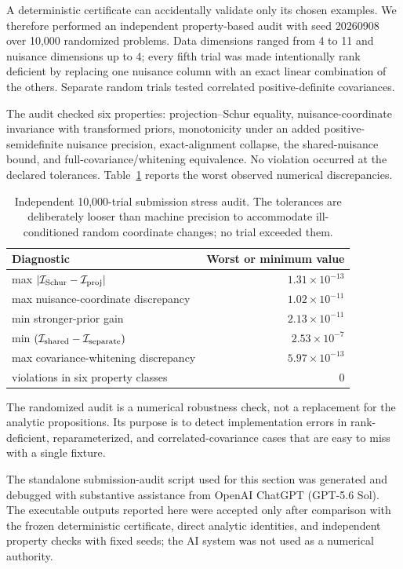A deterministic certificate can accidentally validate only its chosen examples. We therefore performed an independent property-based audit with seed 20260908 over 10,000 randomized problems. Data dimensions ranged from 4 to 11 and nuisance dimensions up to 4; every fifth trial was made intentionally rank deficient by replacing one nuisance column with an exact linear combination of the others. Separate random trials tested correlated positive-definite covariances.

The audit checked six properties: projection--Schur equality, nuisance-coordinate invariance with transformed priors, monotonicity under an added positive-semidefinite nuisance precision, exact-alignment collapse, the shared-nuisance bound, and full-covariance/whitening equivalence. No violation occurred at the declared tolerances. Table~\ref{tab:stress} reports the worst observed numerical discrepancies.

\begin{table}[t]
\caption{Independent 10,000-trial submission stress audit. The tolerances are deliberately looser than machine precision to accommodate ill-conditioned random coordinate changes; no trial exceeded them.}
\label{tab:stress}
\begin{ruledtabular}
\begin{tabular}{p{}r}
Diagnostic & Worst or minimum value\\
\hline
max $|\mathcal I_{\rm Schur}-\mathcal I_{\rm proj}|$ & $1.31\times10^{-13}$\\
max nuisance-coordinate discrepancy & $1.02\times10^{-11}$\\
min stronger-prior gain & $2.13\times10^{-11}$\\
min $(\mathcal I_{\rm shared}-\mathcal I_{\rm separate})$ & $2.53\times10^{-7}$\\
max covariance-whitening discrepancy & $5.97\times10^{-13}$\\
violations in six property classes & $0$\\
\end{tabular}
\end{ruledtabular}
\end{table}

The randomized audit is a numerical robustness check, not a replacement for the analytic propositions. Its purpose is to detect implementation errors in rank-deficient, reparameterized, and correlated-covariance cases that are easy to miss with a single fixture.

The standalone submission-audit script used for this section was generated and debugged with substantive assistance from OpenAI ChatGPT (GPT-5.6 Sol). The executable outputs reported here were accepted only after comparison with the frozen deterministic certificate, direct analytic identities, and independent property checks with fixed seeds; the AI system was not used as a numerical authority.


